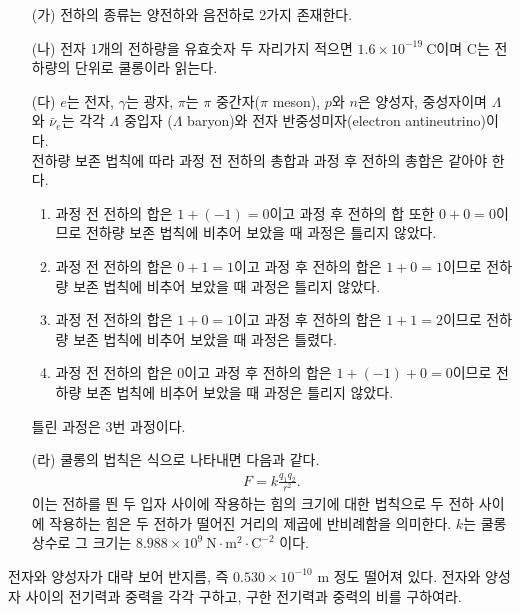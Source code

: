 \documentclass[floatfix,nofootinbib,superscriptaddress,fleqn,notitlepage]{revtex4-2}
\begin{document}
\begin{itemize}
  \item[(가)] 전하의 종류는 양전하와 음전하로 2가지 존재한다.
  \item[(나)] 전자 1개의 전하량을 유효숫자 두 자리가지 적으면 $1.6\times 10^{-19}~\mathrm{C}$이며 
  C는 전하량의 단위로 쿨롱이라 읽는다.
  \item[(다)] $e$는 전자, $\gamma$는 광자, $\pi$는 $\pi$ 중간자($\pi$ meson), 
  $p$와 $n$은 양성자, 중성자이며 $\Lambda$와 $\bar{\nu}_e$는 각각 $\Lambda$ 중입자
  ($\Lambda$ baryon)와 전자 반중성미자(electron antineutrino)이다.  \\
  전하량 보존 법칙에 따라 과정 전 전하의 총합과 과정 후 전하의 총합은 같아야 한다.
  \begin{enumerate}
    \item 과정 전 전하의 합은 $1+(-1)=0$이고 과정 후 전하의 합 또한 $0+0=0$이므로 
    전하량 보존 법칙에 비추어 보았을 때 과정은 틀리지 않았다.
    \item 과정 전 전하의 합은 $0+1=1$이고 과정 후 전하의 합은 $1+0=1$이므로
    전하량 보존 법칙에 비추어 보았을 때 과정은 틀리지 않았다.
    \item 과정 전 전하의 합은 $1+0=1$이고 과정 후 전하의 합은 $1+1=2$이므로
    전하량 보존 법칙에 비추어 보았을 때 과정은 틀렸다.
    \item 과정 전 전하의 합은 $0$이고 과정 후 전하의 합은 $1+(-1)+0=0$이므로
    전하량 보존 법칙에 비추어 보았을 때 과정은 틀리지 않았다.
    \end{enumerate}
    틀린 과정은 3번 과정이다.
  \item[(라)] 쿨롱의 법칙은 식으로 나타내면 다음과 같다.
  \begin{align}
    F=k\frac{q_1q_2}{r^2}.
  \end{align}
  이는 전하를 띈 두 입자 사이에 작용하는 힘의 크기에 대한 법칙으로 두 전하 사이에 작용하는 힘은 
  두 전하가 떨어진 거리의 제곱에 반비례함을 의미한다. $k$는 쿨롱 상수로 그 크기는
  $8.988\times 10^{9}~\mathrm{N\cdot m^2\cdot C^{-2}}$ 이다.
\end{itemize}

\vspace{1.cm}
전자와 양성자가 대략 보어 반지름, 즉 $0.530\times 10^{-10}$ m 정도
떨어져 있다. 전자와 양성자 사이의 전기력과 중력을 각각 구하고, 구한
전기력과 중력의 비를 구하여라. 
\vspace{1.cm}
\end{document}
